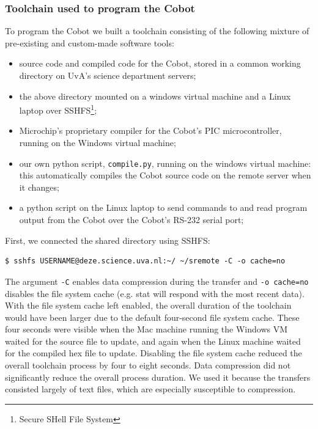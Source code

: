 \documentclass[a4paper,10pt]{article} %
\begin{document}


\subsubsection{Toolchain used to program the Cobot} %
\label{ssub:Toolchain used to program the Cobot}

To program the Cobot we built a toolchain consisting of the following mixture of
pre-existing and custom-made software tools:

\begin{itemize}
    \item source code and compiled code for the Cobot, stored in a common
    working directory on UvA's science department servers;
    \item  the above directory mounted on a windows virtual machine and a Linux
    laptop over SSHFS\footnote{Secure SHell File System};
    \item Microchip's proprietary compiler for the Cobot's PIC microcontroller,
    running on the Windows virtual machine;
    \item our own python script, \texttt{compile.py}, running on the windows
    virtual machine: this automatically compiles the Cobot source code on the
    remote server when it changes;
    \item a python script on the Linux laptop to send commands to and read program
    output from the Cobot over the Cobot's RS-232 serial port;
\end{itemize}

\noindent First, we connected the shared directory using SSHFS:

\begin{verbatim}
$ sshfs USERNAME@deze.science.uva.nl:~/ ~/sremote -C -o cache=no
\end{verbatim}

The argument \texttt{-C} enables data compression during the transfer and
\texttt{-o cache=no} disables the file system cache (e.g. stat will respond with
the most recent data). With the file system cache left enabled, the overall
duration of the toolchain would have been larger due to the default four-second
file system cache. These four seconds were visible when the Mac machine running
the Windows VM waited for the source file to update, and again when the Linux
machine waited for the compiled hex file to update. Disabling the file system
cache reduced the overall toolchain process by four to eight seconds. Data
compression did not significantly reduce the overall process duration. We used
it because the transfers consisted largely of text files, which are especially
susceptible to compression.
\end{document}

